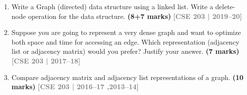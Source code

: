 \documentclass[12pt,a3paper]{article}
\newcommand{\yr}[1]{\hfill\textcolor{gray}{\small\textbf{[#1]}}}
\newcommand{\mk}[1]{\textcolor{orange!70!black}{\small\textbf{(#1 marks)}}}
\begin{document}
\begin{enumerate}
\[
\begin{array}{c|cccccccccc}
  & 1 & 2 & 3 & 4 & 5 & 6 & 7 & 8 & 9 & 10 \\
\hline
1  & 0 & 0 & 1 & 0 & 0 & 0 & 1 & 0 & 1 & 0 \\
2  & 0 & 0 & 0 & 0 & 1 & 0 & 0 & 0 & 0 & 0 \\
3  & 0 & 0 & 0 & 0 & 0 & 1 & 0 & 0 & 0 & 0 \\
4  & 1 & 0 & 0 & 0 & 0 & 0 & 0 & 1 & 0 & 0 \\
5  & 0 & 0 & 0 & 0 & 0 & 0 & 0 & 0 & 1 & 0 \\
6  & 0 & 0 & 0 & 0 & 0 & 0 & 1 & 0 & 0 & 0 \\
7  & 0 & 0 & 1 & 0 & 0 & 0 & 0 & 0 & 0 & 0 \\
8  & 0 & 0 & 0 & 0 & 0 & 0 & 0 & 0 & 0 & 1 \\
9  & 0 & 1 & 0 & 1 & 0 & 0 & 0 & 0 & 0 & 1 \\
10 & 0 & 0 & 0 & 0 & 0 & 0 & 0 & 1 & 0 & 0 \\
\end{array}
\]


\item Write a Graph (directed) data structure using a linked list. Write a delete-node operation for the data structure. \mk{8+7}
\yr{CSE 203 | 2019--20}

\item Suppose you are going to represent a very dense graph and want to optimize both space and time for accessing an edge. Which representation (adjacency list or adjacency matrix) would you prefer? Justify your answer. \mk{7}
\yr{CSE 203 | 2017--18}

\item Compare adjacency matrix and adjacency list representations of a graph. \mk{10}
\yr{CSE 203 | 2016--17 ,2013--14}


\end{enumerate}
\end{document}
